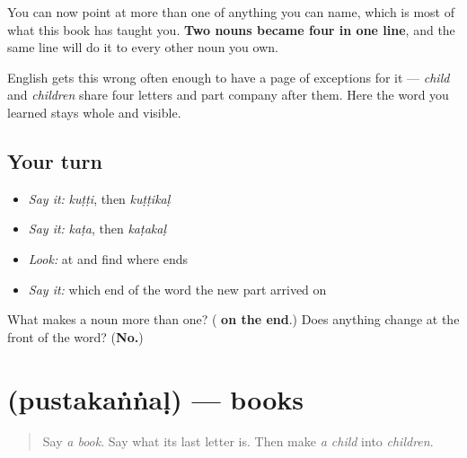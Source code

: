 \begin{grammarlens}[title={What you've built}]
You can now point at more than one of anything you can name, which is most of what this book has taught you. \textbf{Two nouns became four in one line}, and the same line will do it to every other noun you own.

English gets this wrong often enough to have a page of exceptions for it — \emph{child} and \emph{children} share four letters and part company after them. Here the word you learned stays whole and visible.
\end{grammarlens}

\subsection*{Your turn}
\begin{itemize}
\raggedright
  \item \emph{Say it:} \emph{kuṭṭi}, then \emph{kuṭṭikaḷ}
  \item \emph{Say it:} \emph{kaṭa}, then \emph{kaṭakaḷ}
  \item \emph{Look:} at \textbf{} and find where \textbf{} ends
  \item \emph{Say it:} which end of the word the new part arrived on
\end{itemize}

\begin{tcolorbox}[breakable,colback=teal!4,colframe=teal!35!black,title={Before you move on}]
What makes a noun more than one? (\textbf{ on the end}.) Does anything change at the front of the word? (\textbf{No.})
\end{tcolorbox}
\section[\texorpdfstring{\ml{പുസ്തകങ്ങൾ} (pustakaṅṅaḷ)}{പുസ്തകങ്ങൾ (pustakaṅṅaḷ)}]{ (pustakaṅṅaḷ) — books}

\label{lesson:ML-C93-angal}



\begin{quote}
Say \emph{a book}. Say what its last letter is. Then make \emph{a child} into \emph{children}.
\end{quote}

